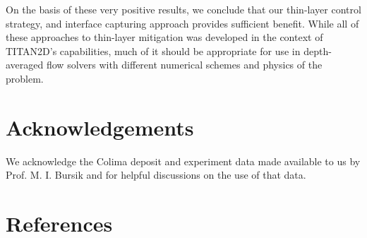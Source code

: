 \documentclass[review]{elsarticle}
\begin{document}
%
On the basis of these very positive results, we conclude that our 
thin-layer control strategy, and interface capturing approach provides sufficient benefit. 
While all of these approaches to thin-layer mitigation was developed in the 
context of TITAN2D's capabilities, much of it should be appropriate 
for use in depth-averaged flow solvers with different numerical 
schemes and physics of the problem.

\section*{Acknowledgements}
 We acknowledge the Colima deposit  and experiment data made available to us by Prof. M. I. Bursik and for helpful discussions on the use of that data.

\section*{References}


\end{document}
